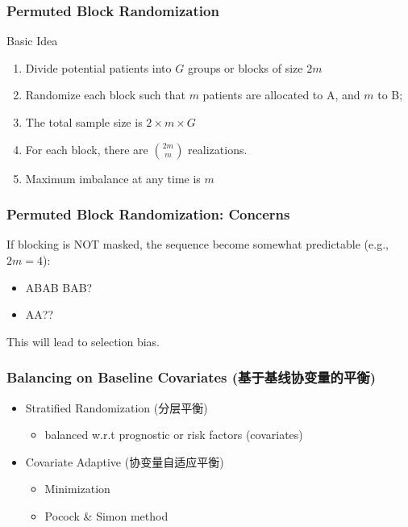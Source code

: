 \documentclass[table,10pt]{beamer}
\begin{document}
\begin{CJK*}{UTF8}{gbsn}
\begin{frame}[t]
\frametitle{Permuted Block Randomization}
\begin{alertblock}{\center Basic Idea}
\begin{enumerate}[(1)]
	\item Divide potential patients into $G$ groups or blocks of size $2m$
	\item Randomize each block such that $m$ patients are allocated to A, and 
		$m$ to B;
	\item The total sample size is $2\times m \times G$
	\item For each block, there are $\binom{2m}{m}$ realizations.
	\item Maximum imbalance at any time is $m$
\end{enumerate}
\end{alertblock}
\end{frame}

\begin{frame}[t]
\frametitle{Permuted Block Randomization: Concerns}
If blocking is NOT masked, the sequence become somewhat predictable 
(e.g., $2m=4$):
\begin{itemize}
	\item ABAB BAB?
	\item AA??
\end{itemize}
This will lead to selection bias.

\end{frame}


\begin{frame}[t]
\frametitle{Balancing on Baseline Covariates (基于基线协变量的平衡)}
\begin{itemize}
	\item Stratified Randomization (分层平衡)
	\begin{itemize}
		\item balanced w.r.t prognostic or risk factors (covariates)
	\end{itemize}
	\item Covariate Adaptive (协变量自适应平衡)
	\begin{itemize}
		\item Minimization
		\item Pocock \& Simon method
	\end{itemize}
\end{itemize}
\end{frame}



\end{CJK*}
\end{document}
